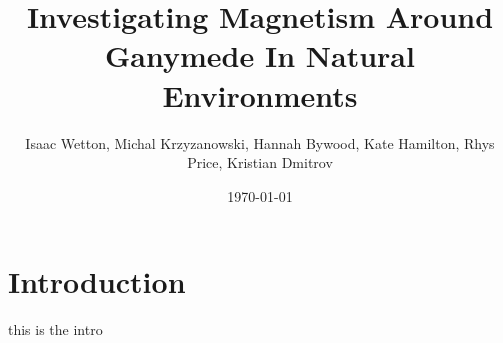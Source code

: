 \documentclass[11pt]{article}
\title{Investigating Magnetism Around Ganymede In Natural Environments}
\author{Isaac Wetton, Michal Krzyzanowski, Hannah Bywood, Kate Hamilton, Rhys Price, Kristian Dmitrov}
\date{\today}
\begin{document}
	
\maketitle
	
\section{Introduction}
\label{sec:intro}

this is the intro
\end{document}
